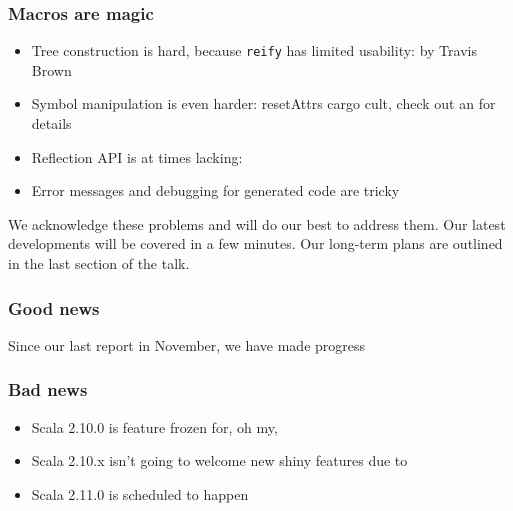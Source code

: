 \documentclass[svgnames,hyperref={bookmarks=false}]{beamer}
\begin{document}
\begin{frame}[fragile]
\frametitle{Macros are magic}

\begin{itemize}
\item Tree construction is hard, because \texttt{reify} has limited usability:  by Travis Brown
\item Symbol manipulation is even harder: resetAttrs cargo cult, check out an  for details
\item Reflection API is at times lacking: 
\item Error messages and debugging for generated code are tricky
\end{itemize}
We acknowledge these problems and will do our best to address them. Our latest developments will be covered in a few minutes. Our long-term plans are outlined in the last section of the talk.
\end{frame}

\begin{frame}[fragile]
\frametitle{}

\vskip40pt
\begin{center}
\end{center}
\end{frame}

\begin{frame}[fragile]
\frametitle{Good news}

Since our last report in November, we have made progress
\end{frame}

\begin{frame}[fragile]
\frametitle{Bad news}

\begin{itemize}
\item Scala 2.10.0 is feature frozen for, oh my, 
\item Scala 2.10.x isn't going to welcome new shiny features due to 
\item Scala 2.11.0 is scheduled to happen 
\end{itemize}
\end{frame}
\end{document}
